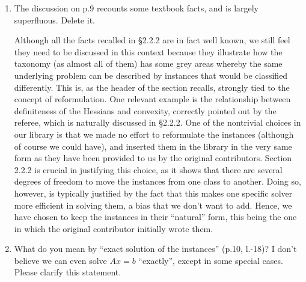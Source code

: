 \documentclass[11pt]{article}
\newcommand{\rep}[1]{{\textcolor{acblue}{#1}}}
\newcommand{\leo}[1]{{\color{red}#1}}
\begin{document}
{\begin{enumerate}
can be solved to global optimality as long as the matrix is second-order sufficient. This means
that even some QPs with indefinite Hessians can easily be solved to global optimality.

\rep{Thank you for having raised this point. We addressed it in Sections 2.2.1 and 2.2.2.
%
}


\item The discussion on p.9 recounts some textbook facts, and is largely superfluous. Delete it.

\rep{
Although all the facts recalled in \S 2.2.2 are in fact well known, we still feel they need to be discussed in this context because they illustrate how the taxonomy (as almost all of them) has some grey areas whereby the same underlying problem can be described by instances that would be classified differently. This is, as the header of the section recalls, strongly tied to the concept of reformulation. One relevant example is the relationship between definiteness of the Hessians and convexity, correctly pointed out by the referee, which is naturally discussed in \S 2.2.2. One of the nontrivial choices in our library is that we made no effort to reformulate the instances (although of course we could have), and inserted them in the library in the very same form as they have been provided to us by the original contributors. Section 2.2.2 is crucial in justifying this choice, as it shows that there are several degrees of freedom to move the instances from one class to another. Doing so, however, is typically justified by the fact that this makes one specific solver more efficient in solving them, a bias that we don't want to add. Hence, we have chosen to keep the instances in their ``natural'' form, this being the one in which the original contributor initially wrote them.
}


\item What do you mean by ``exact solution of the instances'' (p.10, l.-18)? I don't believe we can even
solve $Ax = b$ ``exactly'', except in some special cases. Please clarify this statement.


\end{enumerate}}
\end{document}

